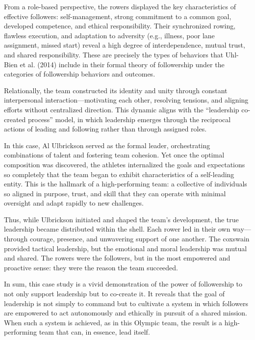 \documentclass[12pt]{article}
\begin{document}
From a role-based perspective, the rowers displayed the key characteristics of effective followers: self-management, strong commitment to a common goal, developed competence, and ethical responsibility. Their synchronized rowing, flawless execution, and adaptation to adversity (e.g., illness, poor lane assignment, missed start) reveal a high degree of interdependence, mutual trust, and shared responsibility. These are precisely the types of behaviors that Uhl-Bien et al. (2014) include in their formal theory of followership under the categories of followership behaviors and outcomes.

Relationally, the team constructed its identity and unity through constant interpersonal interaction—motivating each other, resolving tensions, and aligning efforts without centralized direction. This dynamic aligns with the “leadership co-created process” model, in which leadership emerges through the reciprocal actions of leading and following rather than through assigned roles.

In this case, Al Ulbrickson served as the formal leader, orchestrating combinations of talent and fostering team cohesion. Yet once the optimal composition was discovered, the athletes internalized the goals and expectations so completely that the team began to exhibit characteristics of a self-leading entity. This is the hallmark of a high-performing team: a collective of individuals so aligned in purpose, trust, and skill that they can operate with minimal oversight and adapt rapidly to new challenges.

Thus, while Ulbrickson initiated and shaped the team’s development, the true leadership became distributed within the shell. Each rower led in their own way—through courage, presence, and unwavering support of one another. The coxswain provided tactical leadership, but the emotional and moral leadership was mutual and shared. The rowers were the followers, but in the most empowered and proactive sense: they were the reason the team succeeded.

In sum, this case study is a vivid demonstration of the power of followership to not only support leadership but to co-create it. It reveals that the goal of leadership is not simply to command but to cultivate a system in which followers are empowered to act autonomously and ethically in pursuit of a shared mission. When such a system is achieved, as in this Olympic team, the result is a high-performing team that can, in essence, lead itself.
\end{document}
